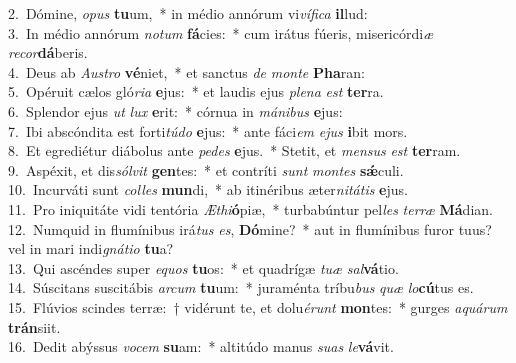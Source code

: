 {2.~}Dómine, \textit{o}\textit{pus} \textbf{tu}um,~* in médio annórum vi\textit{ví}\textit{fi}\textit{ca} \textbf{il}lud:\\
{3.~}In médio annórum \textit{no}\textit{tum} \textbf{fá}cies:~* cum irátus fúeris, misericórdi\textit{æ} \textit{re}\textit{cor}\textbf{dá}beris.\\
{4.~}Deus ab \textit{Au}\textit{stro} \textbf{vé}niet,~* et sanctus \textit{de} \textit{mon}\textit{te} \textbf{Pha}ran:\\
{5.~}Opéruit cælos gló\textit{ri}\textit{a} \textbf{e}jus:~* et laudis ejus \textit{ple}\textit{na} \textit{est} \textbf{ter}ra.\\
{6.~}Splendor ejus \textit{ut} \textit{lux} \textbf{e}rit:~* córnua in \textit{má}\textit{ni}\textit{bus} \textbf{e}jus:\\
{7.~}Ibi abscóndita est forti\textit{tú}\textit{do} \textbf{e}jus:~* ante fáci\textit{em} \textit{e}\textit{jus} \textbf{i}bit mors.\\
{8.~}Et egrediétur diábolus ante \textit{pe}\textit{des} \textbf{e}jus.~* Stetit, et \textit{men}\textit{sus} \textit{est} \textbf{ter}ram.\\
{9.~}Aspéxit, et dis\textit{sól}\textit{vit} \textbf{gen}tes:~* et contríti \textit{sunt} \textit{mon}\textit{tes} \textbf{sǽ}culi.\\
{10.~}Incurváti sunt \textit{col}\textit{les} \textbf{mun}di,~* ab itinéribus æter\textit{ni}\textit{tá}\textit{tis} \textbf{e}jus.\\
{11.~}Pro iniquitáte vidi tentória \textit{Æ}\textit{thi}\textbf{ó}piæ,~* turbabúntur pel\textit{les} \textit{ter}\textit{ræ} \textbf{Má}dian.\\
{12.~}Numquid in flumínibus irá\textit{tus} \textit{es}, \textbf{Dó}mine?~* aut in flumínibus furor tuus? vel in mari indi\textit{gná}\textit{ti}\textit{o} \textbf{tu}a?\\
{13.~}Qui ascéndes super \textit{e}\textit{quos} \textbf{tu}os:~* et quadrígæ \textit{tu}\textit{æ} \textit{sal}\textbf{vá}tio.\\
{14.~}Súscitans suscitábis \textit{ar}\textit{cum} \textbf{tu}um:~* juraménta tríbu\textit{bus} \textit{quæ} \textit{lo}\textbf{cú}tus es.\\
{15.~}Flúvios scindes terræ:~† vidérunt te, et dolu\textit{é}\textit{runt} \textbf{mon}tes:~* gurges \textit{a}\textit{quá}\textit{rum} \textbf{trán}siit.\\
{16.~}Dedit abýssus \textit{vo}\textit{cem} \textbf{su}am:~* altitúdo manus \textit{su}\textit{as} \textit{le}\textbf{vá}vit.\\
